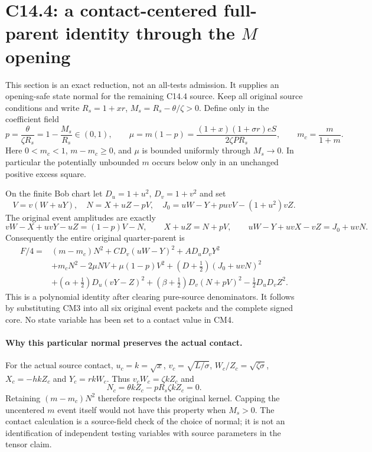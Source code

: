 \section{C14.4: a contact-centered full-parent identity through the $M$ opening}
\label{sec:recovery-c144-centered-m}

This section is an exact reduction, not an all-tests admission. It supplies
an opening-safe state normal for the remaining C14.4 source. Keep all
original source conditions and write $R_s=1+xr$, $M_s=R_s-\theta/\zeta>0$.
Define only in the coefficient field
\[
 p=\frac{\theta}{\zeta R_s}=1-\frac{M_s}{R_s}\in(0,1),\qquad
 \mu=m(1-p)=\frac{(1+x)(1+\sigma r)eS}{2\zeta P R_s},\qquad
 m_c=\frac m{1+m}.
 \tag{CM1}
\]
Here $0<m_c<1$, $m-m_c\ge0$, and $\mu$ is bounded uniformly through
$M_s\to0$. In particular the potentially unbounded $m$ occurs below
only in an unchanged positive excess square.

On the finite Bob chart let $D_u=1+u^2$, $D_v=1+v^2$ and set
\[
 V=v(W+uY),\quad N=X+uZ-pV,\quad
 J_0=uW-Y+puvV-(1+u^2)vZ.\tag{CM2}
\]
The original event amplitudes are exactly
\[
 vW-X+uvY-uZ=(1-p)V-N,\qquad
 X+uZ=N+pV,\qquad
 uW-Y+uvX-vZ=J_0+uvN.\tag{CM3}
\]
Consequently the entire original quarter-parent is
\[
\begin{split}
 F/4={}&(m-m_c)N^2+C D_v(uW-Y)^2+A D_uD_vY^2\\
 &+m_cN^2-2\mu NV+\mu(1-p)V^2
 +(D+\tfrac12)(J_0+uvN)^2\\
 &+(\alpha+\tfrac12)D_u(vY-Z)^2
 +(\beta+\tfrac12)D_v(N+pV)^2-\tfrac12D_uD_vZ^2.
\end{split}\tag{CM4}
\]
This is a polynomial identity after clearing pure-source denominators.
It follows by substituting CM3 into all six original event packets and
the complete signed core. No state variable has been set to a contact
value in CM4.

\paragraph{Why this particular normal preserves the actual contact.}
For the actual source contact, $u_c=k=\sqrt x$,
$v_c=\sqrt{L/\sigma}$, $W_c/Z_c=\sqrt{\zeta\sigma}$,
$X_c=-hkZ_c$ and $Y_c=rkW_c$. Thus
$v_cW_c=\zeta kZ_c$ and
\[
 N_c=\theta kZ_c-pR_s\zeta kZ_c=0.\tag{CM5}
\]
Retaining $(m-m_c)N^2$ therefore respects the original kernel. Capping
the uncentered $m$ event itself would not have this property when $M_s>0$.
The contact calculation is a source-field check of the choice of normal;
it is not an identification of independent testing variables with source
parameters in the tensor claim.


